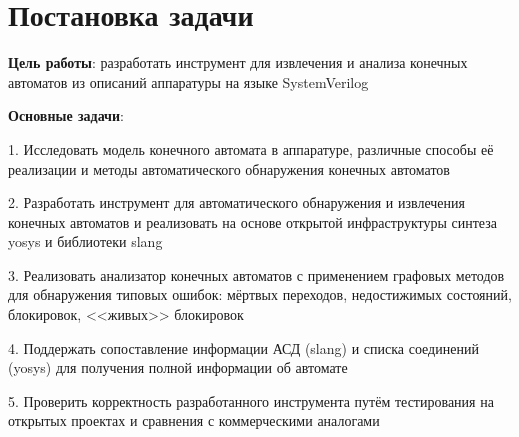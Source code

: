\section{Постановка задачи}
\label{sec:Chapter1} 

\textbf{Цель работы}: разработать инструмент для извлечения и анализа конечных автоматов из описаний
аппаратуры на языке SystemVerilog

\textbf{Основные задачи}:

1. Исследовать модель конечного автомата в аппаратуре, различные способы её реализации и методы
автоматического обнаружения конечных автоматов

2. Разработать инструмент для автоматического обнаружения и извлечения конечных автоматов и реализовать
на основе открытой инфраструктуры синтеза yosys и библиотеки slang

3. Реализовать анализатор конечных автоматов с применением графовых методов для обнаружения типовых ошибок:
мёртвых переходов, недостижимых состояний, блокировок, <<живых>> блокировок

4. Поддержать сопоставление информации АСД (slang) и списка соединений (yosys) для получения полной
информации об автомате

5. Проверить корректность разработанного инструмента путём тестирования на открытых проектах и сравнения
с коммерческими аналогами
